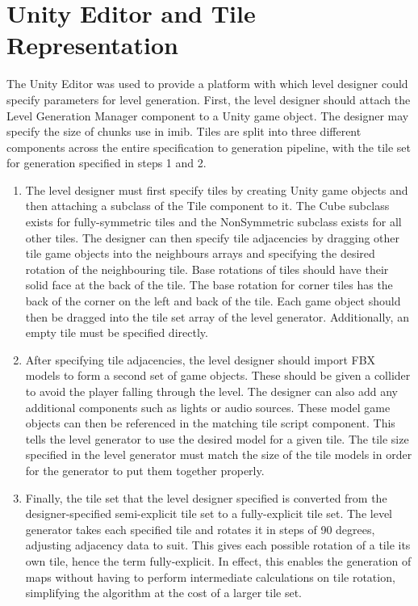 \section{Unity Editor and Tile Representation}
The Unity Editor was used to provide a platform with which level designer could specify parameters for level generation. First, the level designer should attach the Level Generation Manager component to a Unity game object. The designer may specify the size of chunks use in \acrlong{imib}. Tiles are split into three different components across the entire specification to generation pipeline, with the tile set for generation specified in steps 1 and 2.
\begin{enumerate}
    \item The level designer must first specify tiles by creating Unity game objects and then attaching a subclass of the Tile component to it. The Cube subclass exists for fully-symmetric tiles and the NonSymmetric subclass exists for all other tiles. The designer can then specify tile adjacencies by dragging other tile game objects into the neighbours arrays and specifying the desired rotation of the neighbouring tile. Base rotations of tiles should have their solid face at the back of the tile. The base rotation for corner tiles has the back of the corner on the left and back of the tile. Each game object should then be dragged into the tile set array of the level generator. Additionally, an empty tile must be specified directly.
    \item After specifying tile adjacencies, the level designer should import FBX models to form a second set of game objects. These should be given a collider to avoid the player falling through the level. The designer can also add any additional components such as lights or audio sources. These model game objects can then be referenced in the matching tile script component. This tells the level generator to use the desired model for a given tile. The tile size specified in the level generator must match the size of the tile models in order for the generator to put them together properly.
    \item Finally, the tile set that the level designer specified is converted from the designer-specified semi-explicit tile set to a fully-explicit tile set. The level generator takes each specified tile and rotates it in steps of 90 degrees, adjusting adjacency data to suit. This gives each possible rotation of a tile its own tile, hence the term fully-explicit. In effect, this enables the generation of maps without having to perform intermediate calculations on tile rotation, simplifying the algorithm at the cost of a larger tile set.
\end{enumerate}

